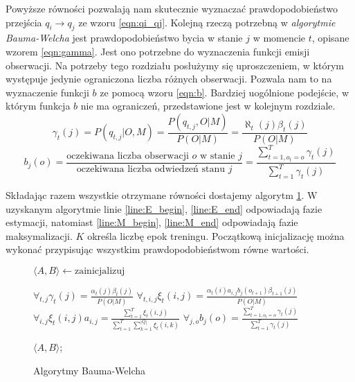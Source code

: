 \documentclass[shortabstract, mgr]{iithesis}
\begin{document}
		Powyższe równości pozwalają nam skutecznie wyznaczać prawdopodobieństwo przejścia $q_i \rightarrow q_j$ ze wzoru \ref{eqn:qi_qj}. Kolejną rzeczą potrzebną w \textit{algorytmie Bauma-Welcha} jest prawdopodobieństwo bycia w stanie $j$ w momencie $t$, opisane wzorem \ref{eqn:gamma}. Jest ono potrzebne do wyznaczenia funkcji emisji obserwacji. Na potrzeby tego rozdziału posłużymy się uproszczeniem, w którym występuje jedynie ograniczona liczba różnych obserwacji. Pozwala nam to na wyznaczenie funkcji $b$ ze pomocą wzoru \ref{eqn:b}. Bardziej uogólnione podejście, w którym funkcja $b$ nie ma ograniczeń, przedstawione jest w kolejnym rozdziale.
		\begin{equation}
			\gamma_t(j) = P(q_{t,j}|O,M) = \frac{P(q_{t,j},O|M)}{P(O|M)} = \frac{\aleph_t(j)\beta_t(j)}{P(O|M)}
			\label{eqn:gamma}
		\end{equation}
		\begin{equation}
			b_j(o)=\frac{\text{oczekiwana liczba obserwacji $o$ w stanie $j$}}{\text{oczekiwana liczba odwiedzeń stanu $j$}} = \frac{\sum_{t=1,o_t=o}^T\gamma_t(j)}{\sum_{t=1}^T\gamma_t(j)}
			\label{eqn:b}
		\end{equation}
		
		Składając razem wszystkie otrzymane równości dostajemy algorytm \ref{alg:Baum_Welch}. W uzyskanym algorytmie linie \ref{line:E_begin}, \ref{line:E_end} odpowiadają fazie estymacji, natomiast \ref{line:M_begin}, \ref{line:M_end} odpowiadają fazie maksymalizacji. $K$ określa liczbę epok treningu. Początkową inicjalizację można wykonać przypisując wszystkim prawdopodobieństwom równe wartości.
		
		\begin{figure}
			\begin{algorithmic}[1]				
				\STATE $\langle A, B\rangle \leftarrow \text{zainicjalizuj}$
				
					\STATE $\forall_{t,j} \gamma_t(j) = \frac{\alpha_t(j)\beta_t(j)}{P(O|M)} \label{line:E_begin}$
					\STATE $\forall_{t,i,j} \xi_t(i,j) = \frac{\alpha_t(i)a_{i,j}b_j(o_{t+1})\beta_{t+1}(j)}{P(O|M)} \label{line:E_end}$
					\STATE
					\STATE $\forall_{i,j} \xi_t(i,j) a_{i,j} = \frac{\sum_{t=1}^T 	\xi_t(i,j)}{\sum_{t=1}^T \sum_{k=1}^{|Q|}	\xi_t(i,k)} \label{line:M_begin}$
					\STATE $\forall_{j,o} 	b_j(o) = \frac{\sum_{t=1,o_t=o}^T\gamma_t(j)}{\sum_{t=1}^T\gamma_t(j)} \label{line:M_end}$
				\ENDFOR							
				
				\RETURN $\langle A, B\rangle$;
			\end{algorithmic}
	
			\caption{Algorytmy Bauma-Welcha}
			\label{alg:Baum_Welch}
		\end{figure}	
		
\end{document}
